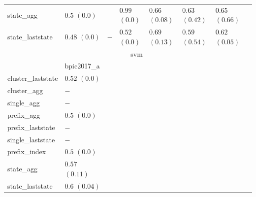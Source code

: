 \documentclass[twoside,11pt]{Latex/Classes/PhDthesisPSnPDF}
\begin{document}
\begin{table}[h]
{\begin{tabular}{llllllll}
			state\_agg & $0.5$ ${(0.0)}$ & $-$  & $0.99$ ${(0.0)}$ & $0.66$ ${(0.08)}$ & $0.63$ ${(0.42)}$ & $0.65$ ${(0.66)}$ \\
			state\_laststate & $0.48$ ${(0.0)}$ & $-$  & $0.52$ ${(0.0)}$ & $0.69$ ${(0.13)}$ & $0.59$ ${(0.54)}$ & $0.62$ ${(0.05)}$ \\
			\bottomrule
			\toprule
			& \multicolumn{5}{c}{svm}
			\\
			& bpic2017\_a
			\\ \midrule
			cluster\_laststate & $0.52$ ${(0.0)}$ \\
			cluster\_agg & $-$  \\
			single\_agg & $-$  \\
			prefix\_agg & $0.5$ ${(0.0)}$ \\
			prefix\_laststate & $-$  \\
			single\_laststate & $-$  \\
			prefix\_index & $0.5$ ${(0.0)}$ \\
			state\_agg & $0.57$ ${(0.11)}$ \\
			state\_laststate & $0.6$ ${(0.04)}$ \\
			\bottomrule
			
		\end{tabular}%
	}
\end{table}











\clearpage
\end{document}
